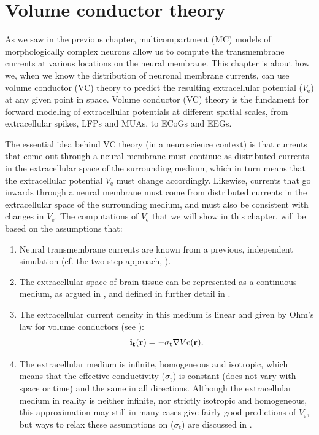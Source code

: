 \chapter{Volume conductor theory}
\label{chap:VC} %
As we saw in the previous chapter, multicompartment (MC) models of morphologically complex neurons allow us to compute the transmembrane currents at various locations on the neural membrane. This chapter is about how we, when we know the distribution of neuronal membrane currents, can use volume conductor (VC) theory to predict the resulting extracellular potential ($V_\mathrm{e}$) at any given point in space. Volume conductor (VC) theory is the fundament for forward modeling of extracellular potentials at different spatial scales, from extracellular spikes, LFPs and MUAs, to ECoGs and EEGs. 

The essential idea behind VC theory (in a neuroscience context) is that currents that come out through a neural membrane must continue as distributed currents in the extracellular space of the surrounding medium, which in turn means that the extracellular potential $V_\mathrm{e}$ must change accordingly. Likewise, currents that go inwards through a neural membrane must come from distributed currents in the extracellular space of the surrounding medium, and must also be consistent with changes in $V_\mathrm{e}$. The computations of $V_\mathrm{e}$ that we will show in this chapter, will be based on the assumptions that:
\begin{enumerate}
\item Neural transmembrane currents are known from a previous, independent simulation (cf. the two-step approach,  ).
\item The extracellular space of brain tissue can be represented as a continuous medium, as argued in , and defined in further detail in . 
\item The extracellular current density in this medium is linear and given by Ohm's law for volume conductors (see ):
\begin{equation}
{\bf i_t}({\bf r}) = - \sigma_\mathrm{t} \nabla V\mathrm{e}({\bf r}).
\label{eq:VC:ohmici}
\end{equation}
\item The extracellular medium is infinite, homogeneous and isotropic, which means that the effective conductivity ($\sigma_\mathrm{t}$) is constant (does not vary with space or time) and the same in all directions. Although the extracellular medium in reality is neither infinite, nor strictly isotropic and homogeneous, this approximation may still in many cases give fairly good predictions of $V_\mathrm{e}$, but ways to relax these assumptions on ($\sigma_\mathrm{t}$) are discussed in .
\end{enumerate}

